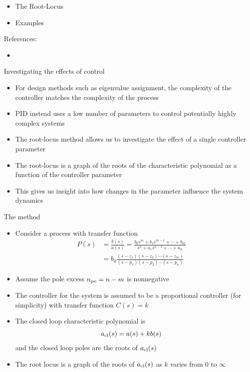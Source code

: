 \documentclass[10pt]{beamer-control}
\begin{document}

\begin{SUMMARY}
\begin{itemize}
\item The Root-Locus
\item Examples
\end{itemize}
\vfill References:
\begin{itemize}
\item \astrom[§12.5]
\end{itemize}
\end{SUMMARY}




\begin{frame}{Investigating the effects of control}
\begin{itemize}
\item For design methods such as eigenvalue assignment, the complexity of the controller matches the complexity of the process
\item PID instead uses a low number of parameters to control potentially highly complex systems
\item The root-locus method allows us to investigate the effect of a single controller parameter
\item The \alert{root-locus} is a graph of the roots of the characteristic polynomial as a function of the controller parameter
\item This gives us insight into how changes in the parameter influence the system dynamics
\end{itemize}
\end{frame}

\begin{frame}{The method}
\begin{itemize}
	\item Consider a process with transfer function
	\begin{align*}
		P(s) &= \frac{b(s)}{a(s)} = \frac{b_0s^m+b_1s^{m-1}+\cdots + b_m}{s^n+a_1s^{n-1}+\cdots + a_n} \\
		&= b_0\frac{(s-z_1)(s-z_2)\cdots (s-z_m)}{(s-p_1)(s-p_2)\cdots(s-p_n)}
	\end{align*}
	\item Assume the pole excess $n_{\text{pe}}=n-m$ is nonnegative
	\item The controller for the system is assumed to be a proportional controller (for simplicity) with transfer function $C(s)=k$
		\item The closed loop characteristic polynomial is 
\begin{equation}
	a_{\text{cl}}(s)=a(s)+kb(s)
\end{equation}
and the closed loop poles are the roots of $a_{\text{cl}}(s)$
\item The root locus is a graph of the roots of $a_{\text{cl}}(s)$ as $k$ varies from $0$ to $\infty$
\end{itemize}
\end{frame}
\end{document}
